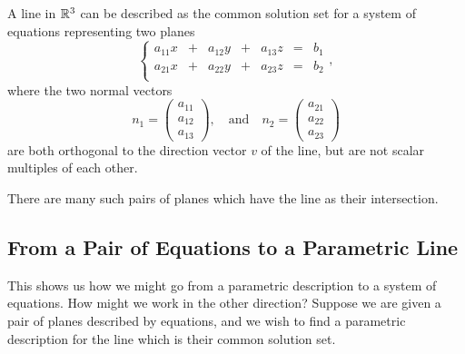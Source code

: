 \documentclass[00-livre-main.tex]{subfiles}
\begin{document}
\begin{theorem}
A line in $\mathbb{R}^3$ can be described as the common solution set for a system of equations representing two planes
\[
\left\{\begin{array}{rrrrrrr}
a_{11} x &+& a_{12}y &+& a_{13} z &=& b_1 \\
a_{21} x &+& a_{22}y &+& a_{23} z &=& b_2 \\
\end{array}\right. ,
\]
where the two normal vectors
\[
n_1 = \begin{pmatrix} a_{11} \\ a_{12} \\ a_{13} \end{pmatrix}, \quad \text{and} \quad
n_2 = \begin{pmatrix} a_{21} \\ a_{22} \\ a_{23} \end{pmatrix}
\]
are both orthogonal to the direction vector $v$ of the line, but are not scalar multiples of each other.

There are many such pairs of planes which have the line as their intersection.
\end{theorem}


\subsection*{From a Pair of Equations to a Parametric Line}

This shows us how we might go from a parametric description to a system of equations. How might we work in the other direction? Suppose we are given a pair of planes described by equations, and we wish to find a parametric description for the line which is their common solution set.
\end{document}
